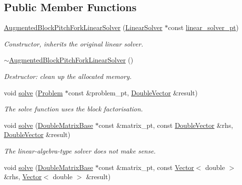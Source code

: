 \subsection*{Public Member Functions}
\begin{DoxyCompactItemize}
\item 
\hyperlink{classoomph_1_1AugmentedBlockPitchForkLinearSolver_a50d533e694ceb1c5a7f2edb10710f98a}{Augmented\+Block\+Pitch\+Fork\+Linear\+Solver} (\hyperlink{classoomph_1_1LinearSolver}{Linear\+Solver} $\ast$const \hyperlink{classoomph_1_1AugmentedBlockPitchForkLinearSolver_a96ac14c60f20314f5be075a68a620b3f}{linear\+\_\+solver\+\_\+pt})
\begin{DoxyCompactList}\small\item\em Constructor, inherits the original linear solver. \end{DoxyCompactList}\item 
\hyperlink{classoomph_1_1AugmentedBlockPitchForkLinearSolver_ab2d75883791a469b2ce32295ed39ab7d}{$\sim$\+Augmented\+Block\+Pitch\+Fork\+Linear\+Solver} ()
\begin{DoxyCompactList}\small\item\em Destructor\+: clean up the allocated memory. \end{DoxyCompactList}\item 
void \hyperlink{classoomph_1_1AugmentedBlockPitchForkLinearSolver_a0cbeb150ac83d5be1a1e30c0f728a70b}{solve} (\hyperlink{classoomph_1_1Problem}{Problem} $\ast$const \&problem\+\_\+pt, \hyperlink{classoomph_1_1DoubleVector}{Double\+Vector} \&result)
\begin{DoxyCompactList}\small\item\em The solve function uses the block factorisation. \end{DoxyCompactList}\item 
void \hyperlink{classoomph_1_1AugmentedBlockPitchForkLinearSolver_a495eeac9b790841fb0b8b1d1c8222667}{solve} (\hyperlink{classoomph_1_1DoubleMatrixBase}{Double\+Matrix\+Base} $\ast$const \&matrix\+\_\+pt, const \hyperlink{classoomph_1_1DoubleVector}{Double\+Vector} \&rhs, \hyperlink{classoomph_1_1DoubleVector}{Double\+Vector} \&result)
\begin{DoxyCompactList}\small\item\em The linear-\/algebra-\/type solver does not make sense. \end{DoxyCompactList}\item 
void \hyperlink{classoomph_1_1AugmentedBlockPitchForkLinearSolver_a8569368b8772d6642a50fb1279f4b61f}{solve} (\hyperlink{classoomph_1_1DoubleMatrixBase}{Double\+Matrix\+Base} $\ast$const \&matrix\+\_\+pt, const \hyperlink{classoomph_1_1Vector}{Vector}$<$ double $>$ \&rhs, \hyperlink{classoomph_1_1Vector}{Vector}$<$ double $>$ \&result)

\end{DoxyCompactItemize}
